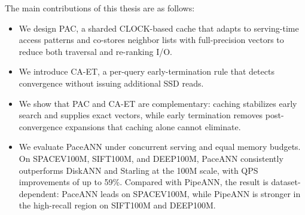 The main contributions of this thesis are as follows:
\begin{itemize}
  \item We design PAC, a sharded CLOCK-based cache that adapts to serving-time access patterns and co-stores neighbor lists with full-precision vectors to reduce both traversal and re-ranking I/O.
  \item We introduce CA-ET, a per-query early-termination rule that detects convergence without issuing additional SSD reads.
  \item We show that PAC and CA-ET are complementary: caching stabilizes early search and supplies exact vectors, while early termination removes post-convergence expansions that caching alone cannot eliminate.
  \item We evaluate PaceANN under concurrent serving and equal memory budgets. On SPACEV100M, SIFT100M, and DEEP100M, PaceANN consistently outperforms DiskANN and Starling at the 100M scale, with QPS improvements of up to 59\%. Compared with PipeANN, the result is dataset-dependent: PaceANN leads on SPACEV100M, while PipeANN is stronger in the high-recall region on SIFT100M and DEEP100M.
\end{itemize}
